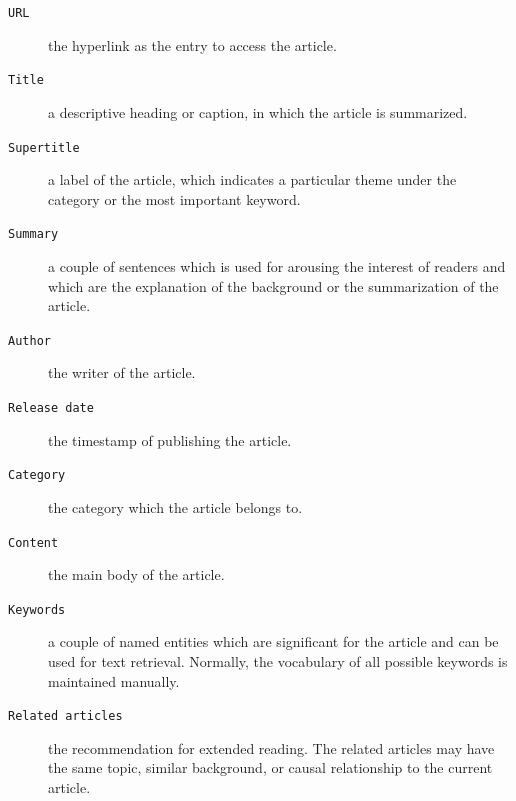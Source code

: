 \begin{description}
    \item[\texttt{URL}] the hyperlink as the entry to access the article.

    \item[\texttt{Title}] a descriptive heading or caption, in which the article is summarized.
    \item[\texttt{Supertitle}] a label of the article, which indicates a particular theme under the category or the most important keyword.
    \item[\texttt{Summary}] a couple of sentences which is used for arousing the interest of readers and which are the explanation of the background or the summarization of the article. 
    \item[\texttt{Author}] the writer of the article.
    \item[\texttt{Release date}] the timestamp of publishing the article.
    \item[\texttt{Category}] the category which the article belongs to.
    \item[\texttt{Content}] the main body of the article.
    \item[\texttt{Keywords}] a couple of named entities which are significant for the article and can be used for text retrieval. Normally, the vocabulary of all possible keywords is maintained manually. 
    \item[\texttt{Related articles}] the recommendation for extended reading. The related articles may have the same topic, similar background, or causal relationship to the current article.
        
\end{description}

